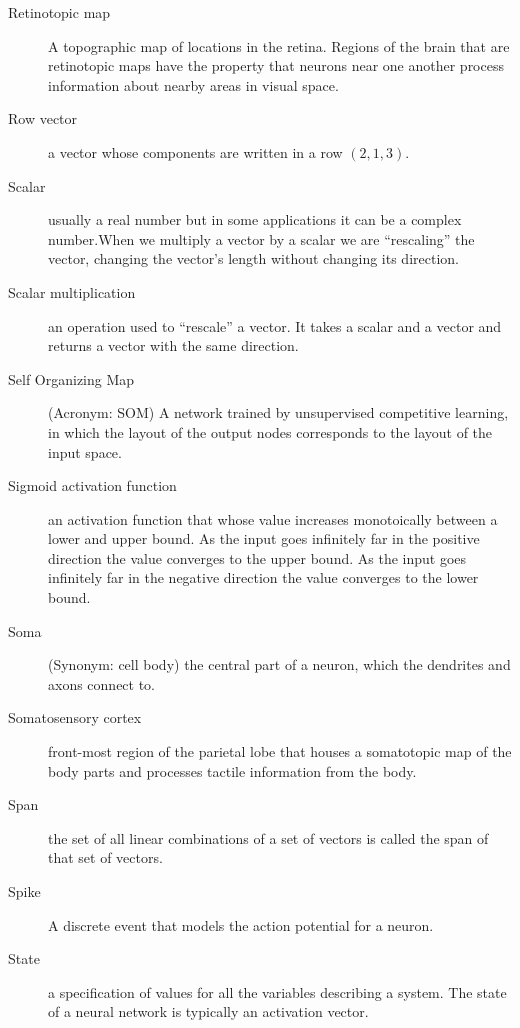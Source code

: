 \begin{description}
\item[Retinotopic map] A topographic map of locations in the retina. Regions of the brain that are retinotopic maps have the property that neurons near one another process information about nearby areas in visual space.

\item[Row vector] a vector whose components are written in a row \eg $(2,1,3)$.

\item[Scalar] usually a real number but in some applications it can be a complex number.When we multiply a vector by a scalar we are ``rescaling'' the vector, \ie changing the vector's length without changing its direction.

\item[Scalar multiplication] an operation used to ``rescale'' a vector. It takes a scalar and a vector and returns a vector with the same direction.

\item[Self Organizing Map] (Acronym: SOM)  A network trained by unsupervised competitive learning, in which the layout of the output nodes corresponds to the layout of the input space.

\item[Sigmoid activation function] an activation function that whose value increases monotoically between a lower and upper bound. As the input goes infinitely far in the positive direction the value converges to the upper bound. As the input goes infinitely far in the negative direction the value converges to the lower bound.


\item[Soma] (Synonym: cell body) the central part of a neuron, which the dendrites and axons connect to.

\item[Somatosensory cortex] front-most region of the parietal lobe that houses a somatotopic map of the body parts and processes tactile information from the body.

\item[Span] the set of all linear combinations of a set of vectors is called the span of that set of vectors.

\item[Spike] A discrete event that models the action potential for a neuron.

\item[State] a specification of values for all the variables describing a system. The state of a neural network is typically an activation vector.


\end{description}
